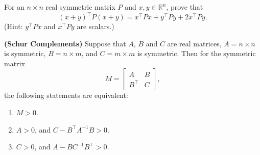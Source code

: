 \begin{exercise}
\label{exercise:ForSchur}
For an $n \times n$ real symmetric matrix $P$ and $x,y \in \mathbb{R}^n$, prove that $$(x+y)^\top P (x+y) = x^\top Px+y^\top Py + 2x^\top Py.$$
(Hint: $y^\top Px$ and $x^\top Py$ are scalars.)
\end{exercise}

\begin{thm} 
\label{thm:SchurComplementTest}
\textbf{(Schur Complements)} Suppose that $A$, $B$ and $C$ are real matrices, $A=n \times n$ is symmetric, $B=n \times m$, and
	$C=m \times m$ is symmetric.  Then for the symmetric matrix
	$$M = \left[ \begin{array}{cc} A & B \\	B^\top & C \end{array} \right],$$
the following statements are equivalent:
	\begin{enumerate}
	   \renewcommand{\labelenumi}{(\alph{enumi})}
        \setlength{\itemsep}{.1cm}
		\item $M>0$.
		\item $A>0$, and $C-B^\top A^{-1} B > 0$.
		\item $C>0$, and $A - B C ^{-1} B^\top >0$.
	\end{enumerate}
\end{thm}


